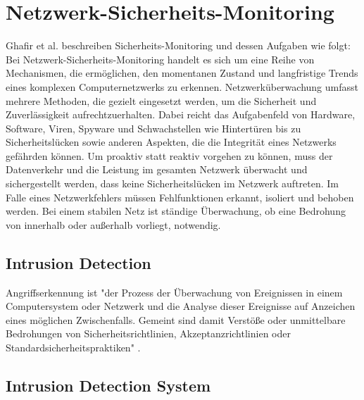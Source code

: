 \section{Netzwerk-Sicherheits-Monitoring}
Ghafir et al. \cite{ghafir_network_2015} beschreiben Sicherheits-Monitoring und dessen Aufgaben wie folgt:%
Bei Netzwerk-Sicherheits-Monitoring handelt es sich um eine Reihe von Mechanismen, die ermöglichen, den momentanen Zustand und langfristige Trends eines komplexen Computernetzwerks zu erkennen. Netzwerküberwachung umfasst mehrere Methoden, die gezielt eingesetzt werden, um die Sicherheit und Zuverlässigkeit aufrechtzuerhalten. Dabei reicht das Aufgabenfeld von Hardware, Software, Viren, Spyware und Schwachstellen wie Hintertüren bis zu Sicherheitslücken sowie anderen Aspekten, die die Integrität eines Netzwerks gefährden können. Um proaktiv statt reaktiv vorgehen zu können, muss der Datenverkehr und die Leistung im gesamten Netzwerk überwacht und sichergestellt werden, dass keine Sicherheitslücken im Netzwerk auftreten. Im Falle eines Netzwerkfehlers müssen Fehlfunktionen erkannt, isoliert und behoben werden. Bei einem stabilen Netz ist ständige Überwachung, ob eine Bedrohung von innerhalb oder außerhalb vorliegt, notwendig.

\subsection{Intrusion Detection}

Angriffserkennung ist "der Prozess der Überwachung von Ereignissen in einem Computersystem oder Netzwerk und die Analyse dieser Ereignisse auf Anzeichen eines möglichen Zwischenfalls. Gemeint sind damit Verstöße oder unmittelbare Bedrohungen von Sicherheitsrichtlinien, Akzeptanzrichtlinien oder Standardsicherheitspraktiken" \cite{scarfone2007guide}.

\subsection{Intrusion Detection System}

